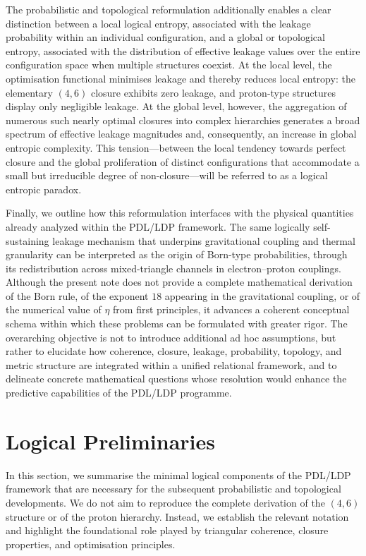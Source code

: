 \documentclass[11pt,a4paper]{article}
\theoremstyle{definition}
\newcommand{\etaL}{\eta} %
\begin{document}
The probabilistic and topological reformulation additionally enables a clear distinction between a local logical entropy, associated with the leakage probability within an individual configuration, and a global or topological entropy, associated with the distribution of effective leakage values over the entire configuration space when multiple structures coexist. At the local level, the optimisation functional minimises leakage and thereby reduces local entropy: the elementary \((4,6)\) closure exhibits zero leakage, and proton-type structures display only negligible leakage. At the global level, however, the aggregation of numerous such nearly optimal closures into complex hierarchies generates a broad spectrum of effective leakage magnitudes and, consequently, an increase in global entropic complexity. This tension—between the local tendency towards perfect closure and the global proliferation of distinct configurations that accommodate a small but irreducible degree of non-closure—will be referred to as a logical entropic paradox.

Finally, we outline how this reformulation interfaces with the physical quantities already analyzed within the PDL/LDP framework. The same logically self-sustaining leakage mechanism that underpins gravitational coupling and thermal granularity can be interpreted as the origin of Born-type probabilities, through its redistribution across mixed-triangle channels in electron–proton couplings. Although the present note does not provide a complete mathematical derivation of the Born rule, of the exponent \(18\) appearing in the gravitational coupling, or of the numerical value of \(\etaL\) from first principles, it advances a coherent conceptual schema within which these problems can be formulated with greater rigor. The overarching objective is not to introduce additional ad hoc assumptions, but rather to elucidate how coherence, closure, leakage, probability, topology, and metric structure are integrated within a unified relational framework, and to delineate concrete mathematical questions whose resolution would enhance the predictive capabilities of the PDL/LDP programme.

\section{Logical Preliminaries}

In this section, we summarise the minimal logical components of the PDL/LDP framework that are necessary for the subsequent probabilistic and topological developments. We do not aim to reproduce the complete derivation of the \((4,6)\) structure or of the proton hierarchy. Instead, we establish the relevant notation and highlight the foundational role played by triangular coherence, closure properties, and optimisation principles.
\end{document}

